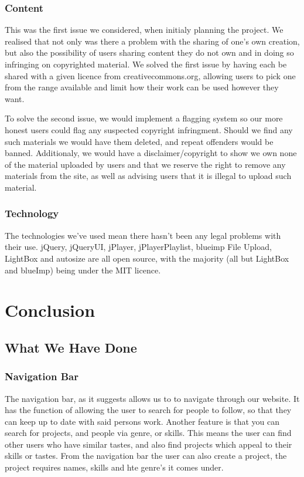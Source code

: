 \documentclass{article}
\begin{document}
\subsubsection{Content}
This was the first issue we considered, when initialy planning the project. We realised that not only was there a problem with the sharing of one's own creation, but also the possibility of users sharing content they do not own and in doing so infringing on copyrighted material. We solved the first issue by having each be shared with a given licence from creativecommons.org, allowing users to pick one from the range available and limit how their work can be used however they want.

To solve the second issue, we would implement a flagging system so our more honest users could flag any suspected copyright infringment. Should we find any such materials we would have them deleted, and repeat offenders would be banned. Additionaly, we would have a disclaimer/copyright to show we own none of the material uploaded by users and that we reserve the right to remove any materials from the site, as well as advising users that it is illegal to upload such material.
\subsubsection{Technology}
The technologies we've used mean there hasn't been any legal problems with their use. jQuery, jQueryUI, jPlayer, jPlayerPlaylist, blueimp File Upload, LightBox and autosize are all open source, with the majority (all but LightBox and blueImp) being under the MIT licence.
\section{Conclusion}
\subsection{What We Have Done}
 \subsubsection{Navigation Bar}
 The navigation bar, as it suggests allows us to to navigate through our website. It has the function of allowing the user to search for people to follow, so that they can keep up to date with said persons work. Another feature is that you can search for projects, and people via genre, or skills. This means the user can find other users who have similar tastes, and also find projects which appeal to their skills or tastes. From the navigation bar the user can also create a project, the project requires names, skills and hte genre's it comes under.
\end{document}

